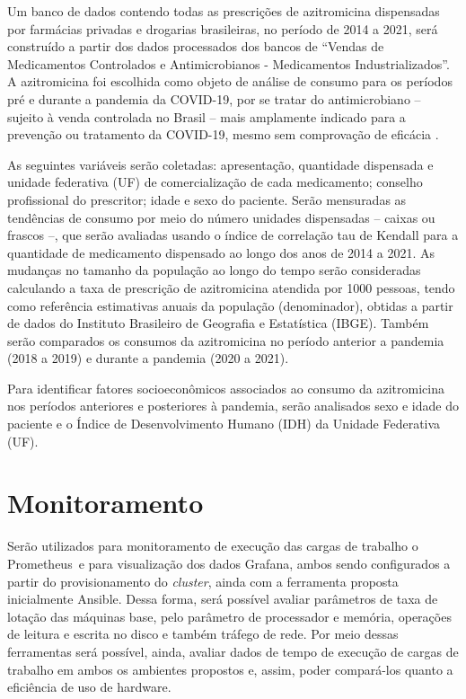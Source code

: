 Um banco de dados contendo todas as prescrições de azitromicina dispensadas por farmácias privadas
e drogarias brasileiras, no período de 2014 a 2021, será construído a partir dos dados processados dos
bancos de “Vendas de Medicamentos Controlados e Antimicrobianos - Medicamentos Industrializados”.
A azitromicina foi escolhida como objeto de análise de consumo para os períodos pré e durante a
pandemia da COVID-19, por se tratar do antimicrobiano – sujeito à venda controlada no Brasil – mais
amplamente indicado para a prevenção ou tratamento da COVID-19, mesmo sem comprovação de
eficácia \cite{santos2021kit}.

As seguintes variáveis serão coletadas: apresentação, quantidade dispensada e unidade federativa (UF)
de comercialização de cada medicamento; conselho profissional do prescritor; idade e sexo do paciente.
Serão mensuradas as tendências de consumo por meio do número unidades dispensadas – caixas ou
frascos –, que serão avaliadas usando o índice de correlação tau de Kendall para a quantidade de
medicamento dispensado ao longo dos anos de 2014 a 2021. As mudanças no tamanho da população
ao longo do tempo serão consideradas calculando a taxa de prescrição de azitromicina atendida por
1000 pessoas, tendo como referência estimativas anuais da população (denominador), obtidas a partir
de dados do Instituto Brasileiro de Geografia e Estatística (IBGE). Também serão comparados os
consumos da azitromicina no período anterior a pandemia (2018 a 2019) e durante a pandemia (2020 a
2021).

Para identificar fatores socioeconômicos associados ao consumo da azitromicina nos períodos anteriores
e posteriores à pandemia, serão analisados sexo e idade do paciente e o Índice de Desenvolvimento
Humano (IDH) da Unidade Federativa (UF).


\section{Monitoramento}
\label{chap:monitor}

Serão utilizados para monitoramento de execução das cargas de trabalho o Prometheus\textregistered \  e para visualização dos dados Grafana\textregistered, ambos sendo configurados a partir do provisionamento do  \emph{cluster}, ainda com a ferramenta proposta inicialmente Ansible\textregistered. Dessa forma, será possível avaliar parâmetros de taxa de lotação das máquinas base, pelo parâmetro de processador e memória, operações de leitura e escrita no disco e também tráfego de rede. Por meio dessas ferramentas será possível, ainda, avaliar dados de tempo de execução de cargas de trabalho em ambos os ambientes propostos e, assim, poder compará-los quanto a eficiência de uso de hardware.

